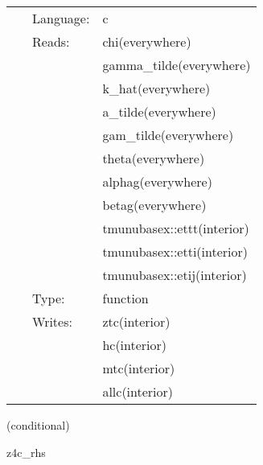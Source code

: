 \begin{tabular*}{160mm}{cll} 
~ & Language:  & c \\ 
~ & Reads:  & chi(everywhere) \\ 
~& ~ &gamma\_tilde(everywhere)\\ 
~& ~ &k\_hat(everywhere)\\ 
~& ~ &a\_tilde(everywhere)\\ 
~& ~ &gam\_tilde(everywhere)\\ 
~& ~ &theta(everywhere)\\ 
~& ~ &alphag(everywhere)\\ 
~& ~ &betag(everywhere)\\ 
~& ~ &tmunubasex::ettt(interior)\\ 
~& ~ &tmunubasex::etti(interior)\\ 
~& ~ &tmunubasex::etij(interior)\\ 
~ & Type:  & function \\ 
~ & Writes:  & ztc(interior) \\ 
~& ~ &hc(interior)\\ 
~& ~ &mtc(interior)\\ 
~& ~ &allc(interior)\\ 
\end{tabular*} 


\vspace{5mm}

   (conditional) 

\hspace{5mm} z4c\_rhs 

\hspace{5mm}{\it calculate z4c rhs } 


\hspace{5mm}

